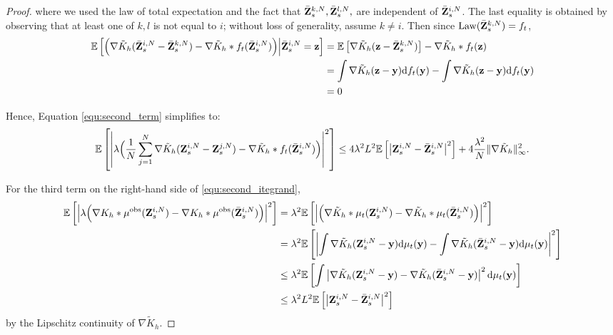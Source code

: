 \begin{proof}
where we used the law of total expectation and the fact that $\bar{\mathbf{Z}}^{k,N}_s, \bar{\mathbf{Z}}^{l,N}_s,$ are independent of $\bar{\mathbf{Z}}^{i,N}_s$. The last equality is obtained by observing that at least one of $k,l$ is not equal to $i$; without loss of generality, assume $k\neq i$. Then since $\mathrm{Law}(\bar{\mathbf{Z}}^{k,N}_s) = f_t$,
\begin{equation*}
\begin{aligned}
\mathbb E \left[ \Big(\nabla \tilde  K_h(\bar{\mathbf{Z}}^{i,N}_s - \bar{\mathbf{Z}}^{k,N}_s) - \nabla\tilde{K}_h*f_t(\bar{\mathbf{Z}}^{i,N}_s) \Big)\Big| \bar{\mathbf{Z}}^{i,N}_s = \mathbf{z}\right] &= \mathbb E \left[\nabla\tilde{K}_h(\mathbf{z}-\bar{\mathbf{Z}}^{k,N}_s)\right] - \nabla \tilde{K}_h*f_t(\mathbf{z})\\
&= \int\nabla\tilde{K}_h(\mathbf{z}-\mathbf{y})\mathrm{d} f_t(\mathbf{y}) - \int \nabla \tilde{K}_h(\mathbf{z}-\mathbf{y})\mathrm{d} f_t(\mathbf{y})
\\&=0
\end{aligned}
\end{equation*}

Hence, Equation \eqref{equ:second_term} simplifies to:
\begin{equation*}
\mathbb E \left[\left|\lambda \Big(\frac{1}{N}\sum_{j=1}^N \nabla \tilde  K_h(\mathbf{Z}^{i,N}_s - \mathbf{Z}^{j,N}_s) - \nabla\tilde{K}_h*f_t(\bar{\mathbf{Z}}^{i,N}_s)  \Big) \right|^2\right] \leq 4\lambda^2 L^2 \mathbb E \left[\left|\mathbf{Z}^{i,N}_s - \bar{\mathbf{Z}}^{i,N}_s\right|^2\right] + 4\frac{\lambda^2}{N} \|\nabla\tilde{K}_h\|_\infty^2.
\end{equation*}

For the third term on the right-hand side of \eqref{equ:second_itegrand}, 
\begin{equation*}
\begin{aligned}
\mathbb E \left[\left|\lambda\Big(\nabla   K_h *\mu^{\mathrm{obs}} (\mathbf{Z}^{i,N}_s) - \nabla   K_h *\mu^{\mathrm{obs}} (\bar{\mathbf{Z}}^{i,N}_s)\Big)\right|^2\right] &= \lambda^2\mathbb E \left[\left|\Big(\nabla \tilde{K}_h *\mu_t (\mathbf{Z}^{i,N}_s) - \nabla \tilde{K}_h *\mu_t (\bar{\mathbf{Z}}^{i,N}_s)\Big)\right|^2\right]\\
& = \lambda^2 \mathbb E \left[\left|\int \nabla \tilde{K}_h(\mathbf{Z}^{i,N}_s-\mathbf{y}) \mathrm{d} \mu_t(\mathbf{y}) - \int \nabla \tilde{K}_h (\bar{\mathbf{Z}}^{i,N}_s - \mathbf{y}) \mathrm{d} \mu_t(\mathbf{y})\right|^2\right]\\
&\leq \lambda^2 \mathbb E \left[\int \left|\nabla \tilde{K}_h (\mathbf{Z}^{i,N}_s-\mathbf{y}) - \nabla \tilde{K}_h (\bar{\mathbf{Z}}^{i,N}_s - \mathbf{y})\right|^2 \mathrm{d} \mu_t (\mathbf{y})\right]\\
&\leq \lambda^2 L^2 \mathbb E \left[ \left|\mathbf{Z}^{i,N}_s - \bar{\mathbf{Z}}^{i,N}_s\right|^2\right]
\end{aligned}
\end{equation*}
by the Lipschitz continuity of $\nabla \tilde{K}_h$.


\end{proof}
